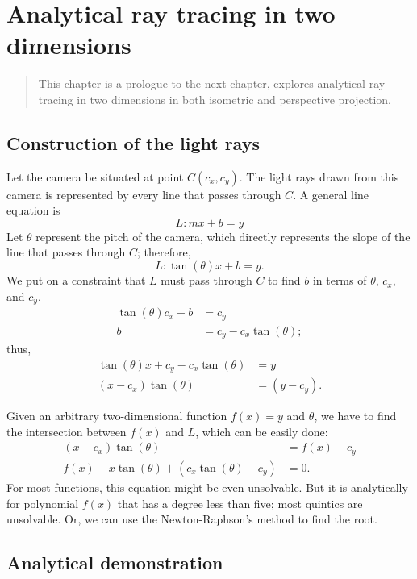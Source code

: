 \chapter{Analytical ray tracing in two dimensions}

\begin{abstract}
    This chapter is a prologue to the next chapter, explores analytical ray tracing in two dimensions in both isometric and perspective projection.
\end{abstract}

\section{Construction of the light rays}

Let the camera be situated at point $C(c_x, c_y)$. The light rays drawn from this camera is represented by every line that passes through $C$. A general line equation is
\begin{equation}
    L: mx + b = y
\end{equation}
Let $\theta$ represent the pitch of the camera, which directly represents the slope of the line that passes through $C$; therefore,
\begin{equation}
    L: \tan(\theta)x + b = y.
\end{equation}
We put on a constraint that $L$ must pass through $C$ to find $b$ in terms of $\theta$, $c_x$, and $c_y$.
\begin{align}
    \tan(\theta)c_x + b &= c_y \\
    b &= c_y - c_x\tan(\theta);
\end{align}
thus,
\begin{align}
    \tan(\theta)x + c_y - c_x\tan(\theta) &= y \\
    (x - c_x)\tan(\theta) &= (y - c_y).
\end{align}

Given an arbitrary two-dimensional function $f(x) = y$ and $\theta$, we have to find the intersection between $f(x)$ and $L$, which can be easily done:
\begin{align}
    (x - c_x)\tan(\theta) &= f(x) - c_y \\
    f(x) - x\tan(\theta) + (c_x\tan(\theta) - c_y) &= 0.
\end{align}
For most functions, this equation might be even unsolvable. But it is analytically for polynomial $f(x)$ that has a degree less than five; most quintics are unsolvable. Or, we can use the Newton-Raphson's method to find the root. 

\section{Analytical demonstration}